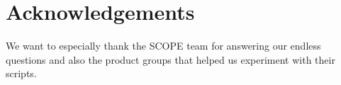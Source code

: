 \documentclass[sigconf, anonymous]{acmart}
\begin{document}
%
%





\maketitle











\section*{Acknowledgements}
We want to especially thank the SCOPE team for answering our endless questions and also the product groups that helped us experiment with their scripts.


 
\end{document}
